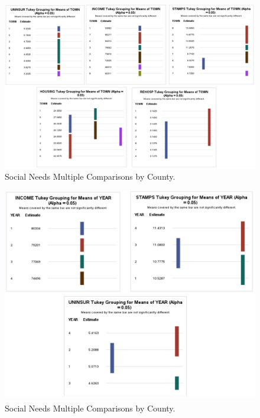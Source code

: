 \documentclass[12pt]{article}
\begin{document}
\begin{figure}[tbp]
  \label{fig:Social Needs by County Graph}
    \centering
    \includegraphics[width=\textwidth]{Multiple Comparisons by County.pdf}
    \caption{Social Needs Multiple Comparisons by County.}
  \end{figure}

  \begin{figure}[tbp]
    \label{fig:Social Needs by YearGraph}
      \centering
      \includegraphics[width=\textwidth]{By Year.pdf}
      \caption{Social Needs Multiple Comparisons by County.}
    \end{figure}
\end{document}
